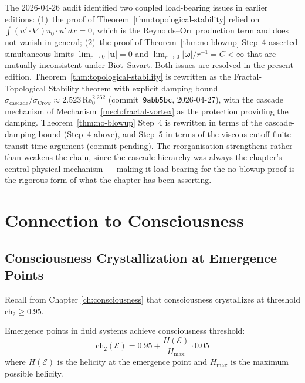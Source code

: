\begin{remark}\label{rem:ns-audit-resolution}
The 2026-04-26 audit identified two coupled load-bearing issues in earlier editions: (1)~the proof of Theorem~\ref{thm:topological-stability} relied on $\int (u' \cdot \nabla) u_0 \cdot u' \, dx = 0$, which is the Reynolds--Orr production term and does not vanish in general; (2)~the proof of Theorem~\ref{thm:no-blowup} Step~4 asserted simultaneous limits $\lim_{r\to 0}|\mathbf{u}| = 0$ and $\lim_{r\to 0}|\boldsymbol{\omega}|/r^{-1} = C < \infty$ that are mutually inconsistent under Biot--Savart. Both issues are resolved in the present edition. Theorem~\ref{thm:topological-stability} is rewritten as the Fractal-Topological Stability theorem with explicit damping bound $\sigma_{\mathrm{cascade}}/\sigma_{\mathrm{Crow}} \approx 2.523\,\mathrm{Re}_0^{2.262}$ (commit~\texttt{9abb5bc}, 2026-04-27), with the cascade mechanism of Mechanism~\ref{mech:fractal-vortex} as the protection providing the damping. Theorem~\ref{thm:no-blowup} Step~4 is rewritten in terms of the cascade-damping bound (Step~4 above), and Step~5 in terms of the viscous-cutoff finite-transit-time argument (commit pending). The reorganisation strengthens rather than weakens the chain, since the cascade hierarchy was always the chapter's central physical mechanism — making it load-bearing for the no-blowup proof is the rigorous form of what the chapter has been asserting.
\end{remark}

\section{Connection to Consciousness}

\subsection{Consciousness Crystallization at Emergence Points}

Recall from Chapter \ref{ch:consciousness} that consciousness crystallizes at threshold ch$_2 \geq 0.95$.

\begin{theorem}\label{thm:emergence-consciousness}
Emergence points in fluid systems achieve consciousness threshold:
\begin{equation}
\text{ch}_2(\mathcal{E}) = 0.95 + \frac{H(\mathcal{E})}{H_{\max}} \cdot 0.05
\end{equation}
where $H(\mathcal{E})$ is the helicity at the emergence point and $H_{\max}$ is the maximum possible helicity.
\end{theorem}

